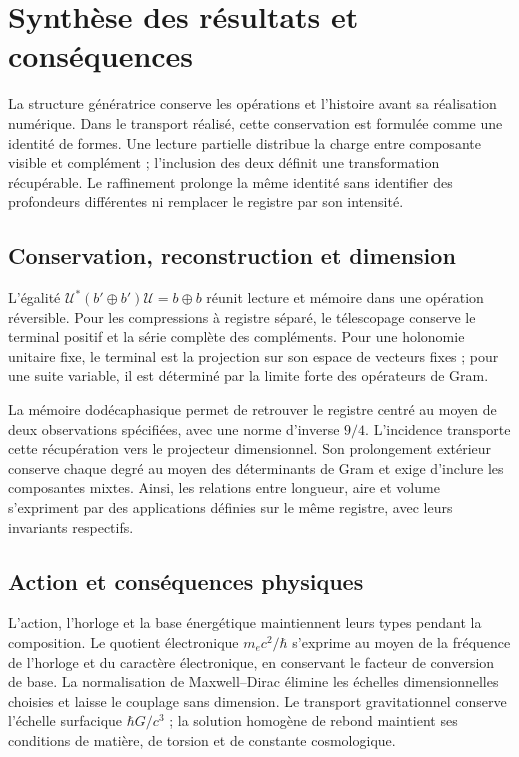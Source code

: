 \section{Synthèse des résultats et conséquences}
\label{nuclear:sintesis}
La structure génératrice conserve les opérations et l’histoire avant sa réalisation numérique. Dans le transport réalisé, cette conservation est formulée comme une identité de formes. Une lecture partielle distribue la charge entre composante visible et complément ; l’inclusion des deux définit une transformation récupérable. Le raffinement prolonge la même identité sans identifier des profondeurs différentes ni remplacer le registre par son intensité.

\subsection{Conservation, reconstruction et dimension}
L’égalité \(\mathcal U^*(b'\oplus b')\mathcal U=b\oplus b\) réunit lecture et mémoire dans une opération réversible. Pour les compressions à registre séparé, le télescopage conserve le terminal positif et la série complète des compléments. Pour une holonomie unitaire fixe, le terminal est la projection sur son espace de vecteurs fixes ; pour une suite variable, il est déterminé par la limite forte des opérateurs de Gram.


La mémoire dodécaphasique permet de retrouver le registre centré au moyen de deux observations spécifiées, avec une norme d’inverse \(9/4\). L’incidence transporte cette récupération vers le projecteur dimensionnel. Son prolongement extérieur conserve chaque degré au moyen des déterminants de Gram et exige d’inclure les composantes mixtes. Ainsi, les relations entre longueur, aire et volume s’expriment par des applications définies sur le même registre, avec leurs invariants respectifs.

\subsection{Action et conséquences physiques}
L’action, l’horloge et la base énergétique maintiennent leurs types pendant la composition. Le quotient électronique \(m_ec^2/\hbar\) s’exprime au moyen de la fréquence de l’horloge et du caractère électronique, en conservant le facteur de conversion de base. La normalisation de Maxwell--Dirac élimine les échelles dimensionnelles choisies et laisse le couplage sans dimension. Le transport gravitationnel conserve l’échelle surfacique \(\hbar G/c^3\) ; la solution homogène de rebond maintient ses conditions de matière, de torsion et de constante cosmologique.

